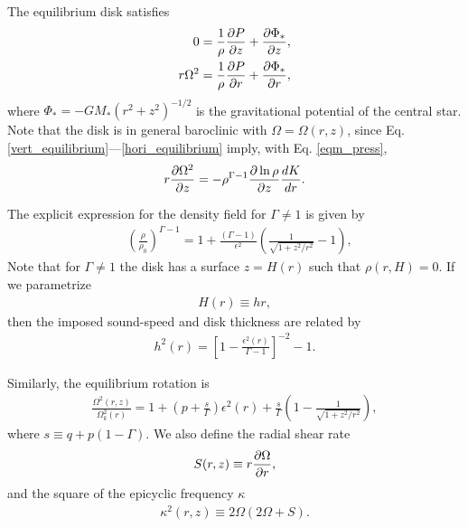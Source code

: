 The equilibrium disk satisfies
\begin{align}
  0 &= \frac{1}{\rho}\frac{\partial P}{\partial z} + \frac{\partial \Phi_*}{\partial z},\label{vert_equilibrium}\\
  r\Omega^2&= \frac{1}{\rho}\frac{\partial P}{\partial r} + \frac{\partial \Phi_*}{\partial
    r},\label{hori_equilibrium} 
\end{align} 
where $\Phi_* = -GM_*(r^2 + z^2)^{-1/2}$ is the gravitational
potential of the central star. Note that the disk is in general
baroclinic with $\Omega = \Omega(r,z)$, since
Eq. \ref{vert_equilibrium}---\ref{hori_equilibrium} imply, with
Eq. \ref{eqm_press},  
\begin{align}
  r\frac{\partial\Omega^2}{\partial z} = - \rho^{\Gamma-1}\frac{\partial\ln\rho}{\partial z}\frac{dK}{dr}.
\end{align}


The explicit expression for the density field for
$\Gamma\neq1$ is given  by
\begin{align}\label{eqm_dens}
  &\left(\frac{\rho}{\rho_0}\right)^{\Gamma-1} = 1 +
  \frac{\left(\Gamma-1\right)}{\epsilon^2}\left(\frac{1}{\sqrt{1+z^2/r^2}}-1\right),
\end{align}
Note that for $\Gamma\neq1$ the disk has a surface $z=H(r)$ such that
$\rho(r,H)=0$. If we parametrize
\begin{align}
  H(r)\equiv h r,
\end{align}
then the imposed sound-speed and disk thickness are related by 
\begin{align}
  h^2(r) = \left[1-\frac{\epsilon^2(r)}{\Gamma-1}\right]^{-2}-1. 
\end{align}

Similarly, the equilibrium rotation is 
\begin{align}\label{eqm_rot}
  \frac{\Omega^2(r,z)}{\Omega_k^2(r)}=1 +
  \left(p+\frac{s}{\Gamma}\right)\epsilon^2(r) 
  +\frac{s}{\Gamma} \left(1-\frac{1}{\sqrt{1+z^2/r^2}}\right), 
\end{align}
where $s\equiv q+p(1-\Gamma)$. We also define the radial shear rate  
\begin{align}
  S(r,z) \equiv r\frac{\partial\Omega}{\partial r},  
\end{align}
and the square of the epicyclic frequency $\kappa$ 
\begin{align}
  \kappa^2(r,z) \equiv 2\Omega(2\Omega + S). 
\end{align}


